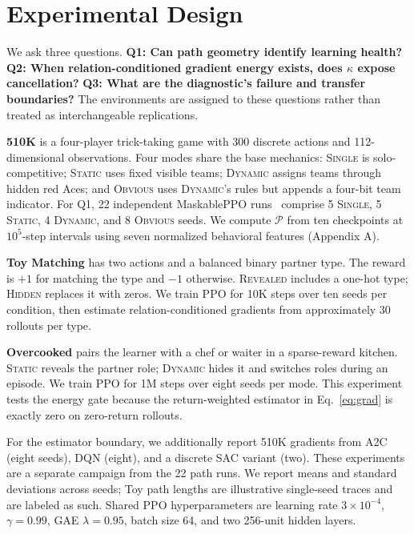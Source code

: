 \documentclass[letterpaper]{article}
\begin{document}
\section{Experimental Design}

We ask three questions.
\textbf{Q1: Can path geometry identify learning health?}
\textbf{Q2: When relation-conditioned gradient energy exists, does $\kappa$ expose cancellation?}
\textbf{Q3: What are the diagnostic's failure and transfer boundaries?}
The environments are assigned to these questions rather than treated as interchangeable replications.

\textbf{510K} is a four-player trick-taking game with 300 discrete actions and 112-dimensional observations.
Four modes share the base mechanics: \textsc{Single} is solo-competitive; \textsc{Static} uses fixed visible teams; \textsc{Dynamic} assigns teams through hidden red Aces; and \textsc{Obvious} uses \textsc{Dynamic}'s rules but appends a four-bit team indicator.
For Q1, 22 independent MaskablePPO runs~\cite{raffin2021stable,huang2022action} comprise 5 \textsc{Single}, 5 \textsc{Static}, 4 \textsc{Dynamic}, and 8 \textsc{Obvious} seeds.
We compute $\mathcal{P}$ from ten checkpoints at $10^5$-step intervals using seven normalized behavioral features (Appendix A).

\textbf{Toy Matching} has two actions and a balanced binary partner type.
The reward is $+1$ for matching the type and $-1$ otherwise.
\textsc{Revealed} includes a one-hot type; \textsc{Hidden} replaces it with zeros.
We train PPO for 10K steps over ten seeds per condition, then estimate relation-conditioned gradients from approximately 30 rollouts per type.

\textbf{Overcooked} pairs the learner with a chef or waiter in a sparse-reward kitchen.
\textsc{Static} reveals the partner role; \textsc{Dynamic} hides it and switches roles during an episode.
We train PPO for 1M steps over eight seeds per mode.
This experiment tests the energy gate because the return-weighted estimator in Eq.~\eqref{eq:grad} is exactly zero on zero-return rollouts.

For the estimator boundary, we additionally report 510K gradients from A2C (eight seeds), DQN (eight), and a discrete SAC variant (two).
These experiments are a separate campaign from the 22 path runs.
We report means and standard deviations across seeds; Toy path lengths are illustrative single-seed traces and are labeled as such.
Shared PPO hyperparameters are learning rate $3\times10^{-4}$, $\gamma=0.99$, GAE $\lambda=0.95$, batch size 64, and two 256-unit hidden layers.
\end{document}
